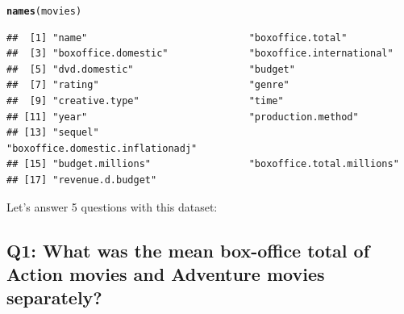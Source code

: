 \documentclass{tufte-book}\usepackage[]{graphicx}\usepackage[]{color}
\makeatletter
\newcommand{\hlstd}[1]{\textcolor[rgb]{0.345,0.345,0.345}{#1}}%
\newcommand{\hlkwd}[1]{\textcolor[rgb]{0.737,0.353,0.396}{\textbf{#1}}}%
\newenvironment{kframe}{%
 \def\at@end@of@kframe{}%
 \ifinner\ifhmode%
  \def\at@end@of@kframe{\end{minipage}}%
  \begin{minipage}{\columnwidth}%
 \fi\fi%
 \def\FrameCommand##1{\hskip\@totalleftmargin \hskip-\fboxsep
 \colorbox{shadecolor}{##1}\hskip-\fboxsep
     \hskip-\linewidth \hskip-\@totalleftmargin \hskip\columnwidth}%
 \MakeFramed {\advance\hsize-\width
   \@totalleftmargin\z@ \linewidth\hsize
   \@setminipage}}%
 {\par\unskip\endMakeFramed%
 \at@end@of@kframe}
\newenvironment{knitrout}{}{} %
\makeatother
\begin{document}
\begin{knitrout}
\color{fgcolor}\begin{kframe}
\begin{alltt}
\hlkwd{names}\hlstd{(movies)}
\end{alltt}
\begin{verbatim}
##  [1] "name"                            "boxoffice.total"                
##  [3] "boxoffice.domestic"              "boxoffice.international"        
##  [5] "dvd.domestic"                    "budget"                         
##  [7] "rating"                          "genre"                          
##  [9] "creative.type"                   "time"                           
## [11] "year"                            "production.method"              
## [13] "sequel"                          "boxoffice.domestic.inflationadj"
## [15] "budget.millions"                 "boxoffice.total.millions"       
## [17] "revenue.d.budget"
\end{verbatim}
\end{kframe}
\end{knitrout}


Let's answer 5 questions with this dataset:

\subsection{Q1: What was the mean box-office total of Action movies and Adventure movies separately?}

\end{document}
